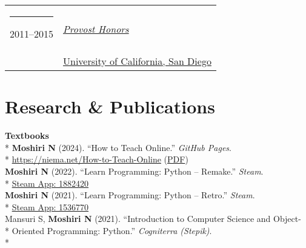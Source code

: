 \documentclass[margin,line]{res}
\begin{document}
\begin{resume}
\begin{longtable}{@{}p{0.7in}p{4in}}
\hspace*{-4mm} \rule{-1mm}{5mm} 2011--2015 & \href{https://roosevelt.ucsd.edu/academics/Academic\%20Opportunities/honors/index.html#Provost-Honors}{\textit{Provost Honors}}\\*
\hspace*{-4mm} \hspace*{-4mm} & \hspace{4mm} \href{http://ucsd.edu/}{University of California, San Diego}\\
\end{longtable}

\section{\sc Research \& Publications}
\textbf{Textbooks}\vspace{2mm}\\*
\hspace*{4mm} \textbf{Moshiri N} (2024). ``How to Teach Online.'' \textit{GitHub Pages}.\\*\vspace{2mm}
\hspace*{8mm} \href{https://niema.net/How-to-Teach-Online}{https://niema.net/How-to-Teach-Online} (\href{https://github.com/niemasd/How-to-Teach-Online/releases/latest/download/How-to-Teach-Online.pdf}{PDF})\\
\hspace*{4mm} \textbf{Moshiri N} (2022). ``Learn Programming: Python -- Remake.'' \textit{Steam}.\\*\vspace{2mm}
\hspace*{8mm} \href{https://store.steampowered.com/app/1882420}{Steam App: 1882420}\\
\hspace*{4mm} \textbf{Moshiri N} (2021). ``Learn Programming: Python -- Retro.'' \textit{Steam}.\\*\vspace{2mm}
\hspace*{8mm} \href{https://store.steampowered.com/app/1536770}{Steam App: 1536770}\\
\hspace*{4mm} Mansuri S, \textbf{Moshiri N} (2021). ``Introduction to Computer Science and Object-\\*
\hspace*{9.5mm} Oriented Programming: Python.'' \textit{Cogniterra (Stepik)}.\\*\vspace{2mm}

\end{resume}
\end{document}
